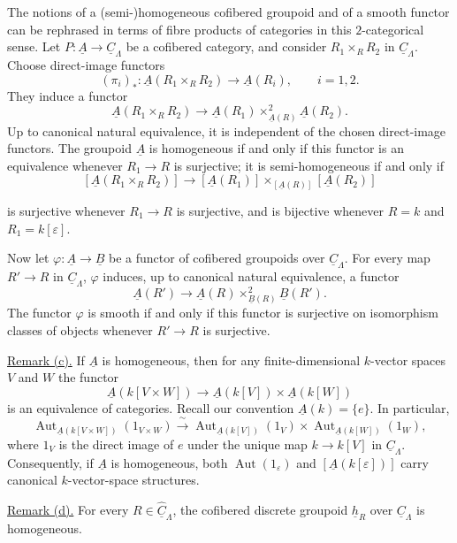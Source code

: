 The notions of a (semi-)homogeneous cofibered groupoid and of a
smooth functor can be rephrased in terms of fibre products of
categories in this $2$-categorical sense. Let
$P:\underline A\longrightarrow\underline C_\Lambda$ be a
cofibered category, and consider $R_1\times_RR_2$ in
$\underline C_\Lambda$. Choose direct-image functors
\[
 (\pi_i)_*:\underline A(R_1\times_RR_2)
 \longrightarrow\underline A(R_i),\qquad i=1,2.
\]
They induce a functor
\[
 \underline A(R_1\times_RR_2)\longrightarrow
 \underline A(R_1)\times^2_{\underline A(R)}\underline A(R_2).
\]
Up to canonical natural equivalence, it is independent of the
chosen direct-image functors. The groupoid $\underline A$ is
homogeneous if and only if this functor is an equivalence whenever
$R_1\longrightarrow R$ is surjective; it is semi-homogeneous if and
only if
\[
 [\underline A(R_1\times_RR_2)]\longrightarrow
 [\underline A(R_1)]
 \times_{[\underline A(R)]}[\underline A(R_2)]
\]


is surjective whenever $R_1\longrightarrow R$ is surjective, and is
bijective whenever $R=k$ and $R_1=k[\varepsilon]$.

Now let $\varphi:\underline A\longrightarrow\underline B$ be a
functor of cofibered groupoids over $\underline C_\Lambda$. For
every map $R'\longrightarrow R$ in $\underline C_\Lambda$,
$\varphi$ induces, up to canonical natural equivalence, a functor
\[
 \underline A(R')\longrightarrow
 \underline A(R)\times^2_{\underline B(R)}\underline B(R').
\]
The functor $\varphi$ is smooth if and only if this functor is
surjective on isomorphism classes of objects whenever
$R'\longrightarrow R$ is surjective.

\underline{Remark (c).} If $\underline A$ is homogeneous, then
for any finite-dimensional $k$-vector spaces $V$ and $W$ the functor
\[
 \underline A(k[V\times W])\longrightarrow
 \underline A(k[V])\times\underline A(k[W])
\]
is an equivalence of categories. Recall our convention
$\underline A(k)=\{e\}$. In particular,
\[
 \operatorname{Aut}_{\underline A(k[V\times W])}(1_{V\times W})
 \xrightarrow{\ \sim\ }
 \operatorname{Aut}_{\underline A(k[V])}(1_V)
 \times
 \operatorname{Aut}_{\underline A(k[W])}(1_W),
\]
where $1_V$ is the direct image of $e$ under the unique map
$k\longrightarrow k[V]$ in $\underline C_\Lambda$. Consequently,
if $\underline A$ is homogeneous, both
$\operatorname{Aut}(1_\varepsilon)$ and
$[\underline A(k[\varepsilon])]$ carry canonical $k$-vector-space
structures.

\underline{Remark (d).} For every
$R\in\widehat{\underline C}_\Lambda$, the cofibered discrete
groupoid $\underline h_R$ over $\underline C_\Lambda$ is
homogeneous.

